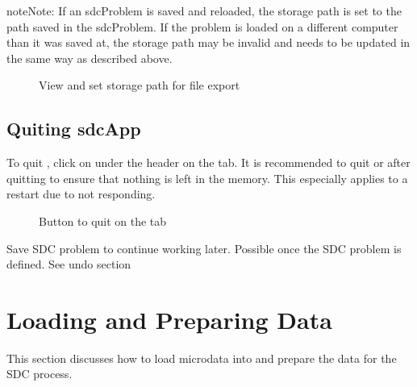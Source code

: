 \documentclass[letterpaper,10pt,english]{sphinxmanual}
\begin{document}
\begin{sphinxadmonition}{note}{Note:}
If an sdcProblem is saved and reloaded, the storage path is set to the path saved
in the sdcProblem. If the problem is loaded on a different computer than it was saved at,
the storage path may be invalid and needs to be updated in the same way as described above.
\end{sphinxadmonition}

\begin{figure}[htbp]
\centering
\capstart

\noindent{}
\caption{View and set storage path for file export}\label{\detokenize{introsdcApp:fig34}}\label{\detokenize{introsdcApp:id5}}\end{figure}


\section{Quiting sdcApp}
\label{\detokenize{introsdcApp:quiting-sdcapp}}
To quit , click on  under the header  on the
 tab. It is recommended to quit  or  after quitting 
to ensure that nothing is left in the memory. This especially applies to a restart due
to  not responding.

\begin{figure}[htbp]
\centering
\capstart

\noindent{}
\caption{Button to quit  on the  tab}\label{\detokenize{introsdcApp:fig35}}\label{\detokenize{introsdcApp:id6}}\end{figure}

Save SDC problem to continue working later. Possible once the SDC problem is defined.
See undo section


\chapter{Loading and Preparing Data}
\label{\detokenize{loadprepdata::doc}}\label{\detokenize{loadprepdata:loading-and-preparing-data}}
This section discusses how to load microdata into  and prepare the data
for the SDC process.
\end{document}
